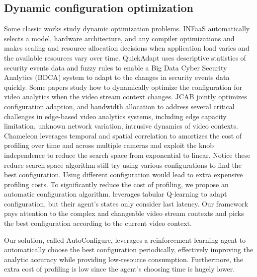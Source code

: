 \subsection{Dynamic configuration optimization}
Some classic works study dynamic optimization problems. INFaaS \cite{romero2019infaas} automatically selects a model, hardware architecture, and any compiler optimizations and makes scaling and resource allocation decisions when application load varies and the available resources vary over time. QuickAdapt \cite{ullah2019quickadapt} uses descriptive statistics of security events data and fuzzy rules to enable a Big Data Cyber Security Analytics (BDCA) system to adapt to the changes in security events data quickly. Some papers study how to dynamically optimize the configuration for video analytics when the video stream context changes. JCAB \cite{wang2020jcab} jointly optimizes configuration adaption, and bandwidth allocation to address several critical challenges in edge-based video analytics systems, including edge capacity limitation, unknown network variation, intrusive dynamics of video contexts. Chameleon \cite{jiang2018chameleon} leverages temporal and spatial correlation to amortizes the cost of profiling over time and across multiple cameras and exploit the knob independence to reduce the search space from exponential to linear. Notice these reduce search space algorithm still try using various configurations to find the best configuration. Using different configuration would lead to extra expensive profiling costs. To significantly reduce the cost of profiling, we propose an automatic configuration algorithm. \cite{argerich2019orchestration} leverages tabular Q-learning to adapt configuration, but their agent's states only consider last latency. Our framework pays attention to the complex and changeable video stream contexts and picks the best configuration according to the current video context. 

Our solution, called AutoConfigure, leverages a reinforcement learning-agent to automatically choose the best configuration periodically, effectively improving the analytic accuracy while providing low-resource consumption. Furthermore, the extra cost of profiling is low since the agent's choosing time is hugely lower. 


